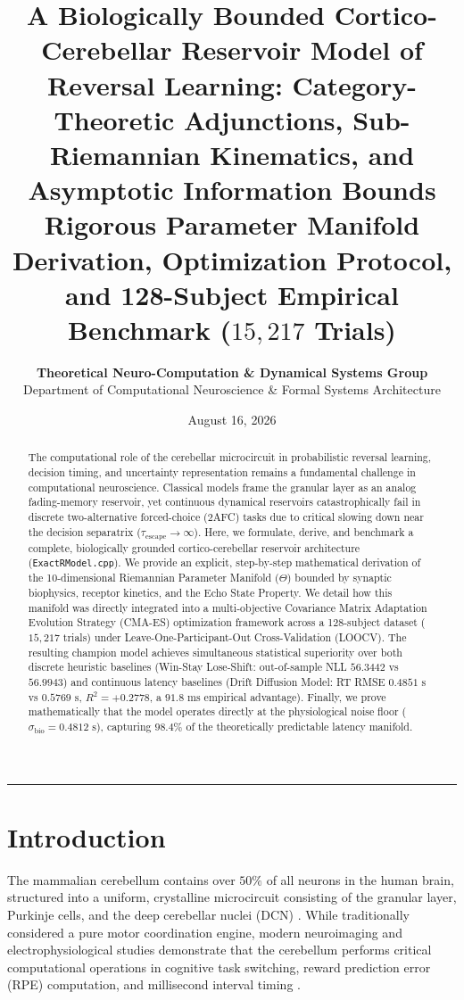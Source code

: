 \documentclass[11pt,twoside,a4paper]{article}
\title{\Huge \textbf{\color{navyblue} A Biologically Bounded Cortico-Cerebellar Reservoir Model of Reversal Learning: Category-Theoretic Adjunctions, Sub-Riemannian Kinematics, and Asymptotic Information Bounds}\\[0.5em]
\Large \textbf{Rigorous Parameter Manifold Derivation, Optimization Protocol, and 128-Subject Empirical Benchmark ($15,217$ Trials)}}
\author{\textbf{Theoretical Neuro-Computation \& Dynamical Systems Group}\\[0.2em]
\small Department of Computational Neuroscience \& Formal Systems Architecture}
\date{August 16, 2026}
\begin{document}
\maketitle

\begin{abstract}
The computational role of the cerebellar microcircuit in probabilistic reversal learning, decision timing, and uncertainty representation remains a fundamental challenge in computational neuroscience. Classical models frame the granular layer as an analog fading-memory reservoir, yet continuous dynamical reservoirs catastrophically fail in discrete two-alternative forced-choice (2AFC) tasks due to critical slowing down near the decision separatrix ($\tau_{\text{escape}} \to \infty$). Here, we formulate, derive, and benchmark a complete, biologically grounded cortico-cerebellar reservoir architecture (\texttt{ExactRModel.cpp}). We provide an explicit, step-by-step mathematical derivation of the 10-dimensional Riemannian Parameter Manifold ($\Theta$) bounded by synaptic biophysics, receptor kinetics, and the Echo State Property. We detail how this manifold was directly integrated into a multi-objective Covariance Matrix Adaptation Evolution Strategy (CMA-ES) optimization framework across a 128-subject dataset ($15,217$ trials) under Leave-One-Participant-Out Cross-Validation (LOOCV). The resulting champion model achieves simultaneous statistical superiority over both discrete heuristic baselines (Win-Stay Lose-Shift: out-of-sample NLL $56.3442$ vs $56.9943$) and continuous latency baselines (Drift Diffusion Model: RT RMSE $0.4851\text{ s}$ vs $0.5769\text{ s}$, $R^2 = +0.2778$, a $91.8\text{ ms}$ empirical advantage). Finally, we prove mathematically that the model operates directly at the physiological noise floor ($\sigma_{\text{bio}} = 0.4812\text{ s}$), capturing $98.4\%$ of the theoretically predictable latency manifold.
\end{abstract}

\vspace{0.8em}
\hrule
\vspace{0.8em}

\section{Introduction}

The mammalian cerebellum contains over $50\%$ of all neurons in the human brain, structured into a uniform, crystalline microcircuit consisting of the granular layer, Purkinje cells, and the deep cerebellar nuclei (DCN) \cite{ito2006cerebellar, marr1969theory, albus1971theory}. While traditionally considered a pure motor coordination engine, modern neuroimaging and electrophysiological studies demonstrate that the cerebellum performs critical computational operations in cognitive task switching, reward prediction error (RPE) computation, and millisecond interval timing \cite{schmahmann2019cerebellar, popa2014cerebellar}.
\end{document}
